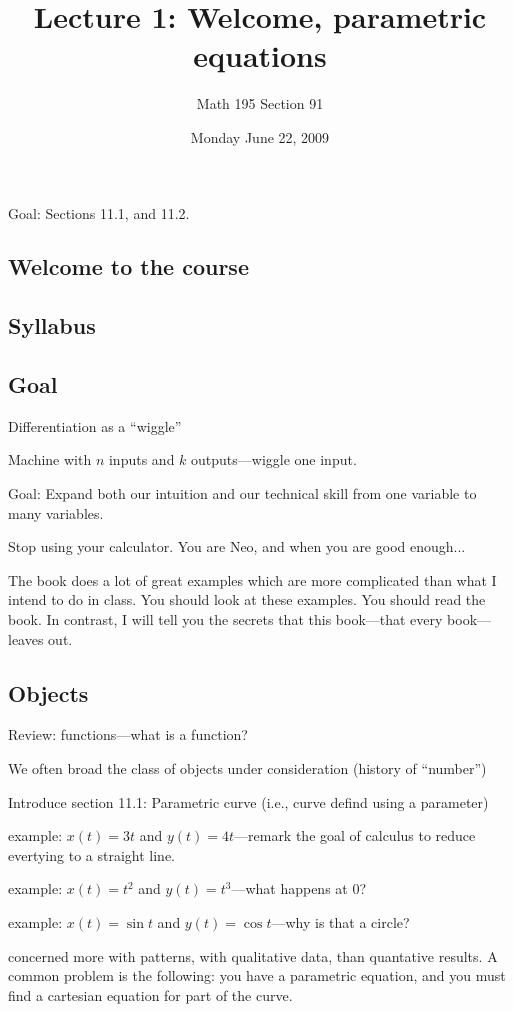 \documentclass[12pt]{article}
\title{Lecture 1: Welcome, parametric equations}
\author{Math 195 Section 91}
\date{Monday June 22, 2009}
\begin{document}
\maketitle

Goal: Sections 11.1, and 11.2.

\subsection*{Welcome to the course}

\subsection*{Syllabus}

\subsection*{Goal}

Differentiation as a ``wiggle''

Machine with $n$ inputs and $k$ outputs---wiggle one input.

Goal: Expand both our intuition and our technical skill from one
variable to many variables.

Stop using your calculator.  You are Neo, and when you are good enough...

The book does a lot of great examples which are more complicated than
what I intend to do in class.  You should look at these examples.  You
should read the book.  In contrast, I will tell you the secrets that
this book---that every book---leaves out.

\subsection*{Objects}

Review: functions---what is a function?

We often broad the class of objects under consideration (history of
``number'')

Introduce section 11.1: Parametric curve (i.e., curve defind using a parameter)

example: $x(t) = 3t$ and $y(t) = 4t$---remark the goal of calculus to reduce evertying to a straight line.

example: $x(t) = t^2$ and $y(t) = t^3$---what happens at 0?

example: $x(t) = \sin t$ and $y(t) = \cos t$---why is that a circle?

concerned more with patterns, with qualitative data, than quantative
results.  A common problem is the following: you have a parametric
equation, and you must find a cartesian equation for part of the
curve.
\end{document}

